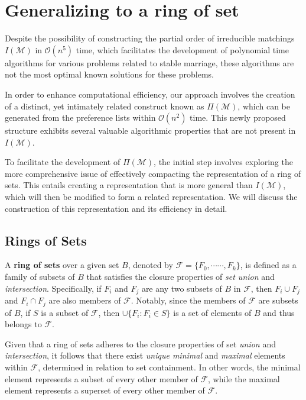 \section{Generalizing to a ring of set}
Despite the possibility of constructing the partial order of irreducible matchings $I(\mathcal{M})$ in $\mathcal{O}(n^5)$ time, which facilitates the development of polynomial time algorithms for various problems related to stable marriage, these algorithms are not the most optimal known solutions for these problems.

In order to enhance computational efficiency, our approach involves the creation of a distinct, yet intimately related construct known as $\Pi(\mathcal{M})$, which can be generated from the preference lists within $\mathcal{O}(n^2)$ time. This newly proposed structure exhibits several valuable algorithmic properties that are not present in $I(\mathcal{M})$.

To facilitate the development of $\Pi(\mathcal{M})$, the initial step involves exploring the more comprehensive issue of effectively compacting the representation of a ring of sets. This entails creating a representation that is more general than $I(\mathcal{M})$, which will then be modified to form a related representation. We will discuss the construction of this representation and its efficiency in detail.

\subsection{Rings of Sets}

A \textbf{ring of sets} over a given set $B$, denoted by $\mathcal{F} = \{F_0 , \cdots \cdots, F_k\}$, is defined as a family of subsets of $B$ that satisfies the closure properties of \textit{set union} and \textit{intersection}. Specifically, if $F_i$ and $F_j$ are any two subsets of $B$ in $\mathcal{F}$, then $F_i \cup F_j$ and $F_i \cap F_j$ are also members of $\mathcal{F}$. Notably, since the members of $\mathcal{F}$ are subsets of $B$, if $S$ is a subset of $\mathcal{F}$, then $\cup \{F_i: F_i \in S\}$ is a set of elements of $B$ and thus belongs to $\mathcal{F}$.

Given that a ring of sets adheres to the closure properties of set \textit{union} and \textit{intersection}, it follows that there exist \textit{unique minimal} and \textit{maximal} elements within $\mathcal{F}$, determined in relation to set containment. In other words, the minimal element represents a subset of every other member of $\mathcal{F}$, while the maximal element represents a superset of every other member of $\mathcal{F}$.

